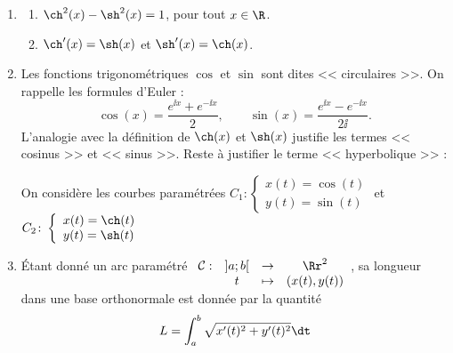 \begin{enumerate}
	\item {}
	\label{prop:chainette1}
	\begin{enumerate}
		\item $\ch^2(x) - \sh^2(x) = 1$, pour tout $x \in \R$.
		\item $\ch '(x) = \sh(x)$ et $\sh'(x) = \ch(x)$.
	\end{enumerate}
   \item 	Les fonctions trigonométriques $\cos$ et $\sin$ sont dites << circulaires >>. On rappelle les formules d'Euler :
   $$\cos(x) = \frac{e^{\ii x} + e^{-\ii x}}{2}, \qquad \sin(x) = \frac{e^{\ii x} - e^{-\ii x}}{2\ii}.$$
   L'analogie avec la définition de $\ch(x)$ et $\sh(x)$ justifie les termes << cosinus >> et << sinus >>. 
   Reste à justifier le terme << hyperbolique >> :
   
   	On considère les courbes paramétrées $C_1 \colon \left\{
   	\begin{array}{l}
   	x(t) = \cos(t)\\
   	y(t) = \sin(t)
   	\end{array}
   	\right.$ et $C_2 \colon \left\{
   	\begin{array}{l}
   	x(t) = \ch(t)\\
   	y(t) = \sh(t)
   	\end{array}
   	\right.$
   	

   \item 		\'Etant donné un arc paramétré $\begin{array}[t]{cccc}
   \mathcal{C} :&\mathcal ]a;b[ &\rightarrow&\Rr^2\\
   &t&\mapsto&(x(t),y(t))
   \end{array}$, sa longueur dans une base orthonormale est donnée par la quantité 
   $$L = \int_a^b \sqrt{x'(t)^2 + y'(t)^2} \dt$$
   

\end{enumerate}
